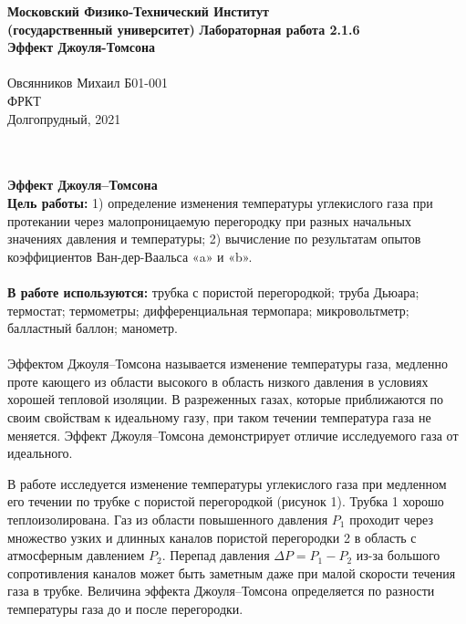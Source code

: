\documentclass[a4paper, 12pt]{article}
\begin{document}
	\begin{titlepage}
		\begin{center}
			\large\textbf{Московский Физико-Технический Институт}\\
			\large\textbf{(государственный университет)}
			\vfill
			\huge\textbf{Лабораторная работа 2.1.6\\ Эффект Джоуля-Томсона}\\
			\ \\
			\large Овсянников Михаил Б01-001\\
			\vfill
			\large ФРКТ\\
			\large Долгопрудный, 2021
		\end{center}
	\end{titlepage}
	\newpage
	\pagestyle{fancy}
	\setcounter{page}{2}
	\fancyfoot[c]{\thepage}
		\\ 
		\\
		\indent \textbf{\LARGE 		Эффект Джоуля–Томсона}
		\\
	
	\textbf{Цель работы:} 
	1) определение изменения температуры углекислого газа при протекании через малопроницаемую перегородку при разных начальных значениях давления и температуры; 2) вычисление по результатам опытов коэффициентов Ван-дер-Ваальса «a» и «b».
	\\ 
	\\
	\indent \textbf{В работе используются:} трубка с пористой перегородкой; труба Дьюара; термостат; термометры; дифференциальная термопара; микровольтметр; балластный баллон; манометр.
	\\
	\\
	\indent Эффектом Джоуля–Томсона называется изменение температуры газа, медленно проте кающего из области высокого в область низкого давления в условиях хорошей тепловой изоляции. В разреженных газах, которые приближаются по своим свойствам к идеальному газу, при таком течении температура газа не меняется. Эффект Джоуля–Томсона демонстрирует отличие исследуемого газа от идеального.
	
\indent В работе исследуется изменение температуры углекислого газа
при медленном его течении по трубке с пористой перегородкой (рисунок 1). Трубка 1 хорошо теплоизолирована. Газ из области повышенного давления $P_{1}$ проходит через множество узких и длинных каналов пористой перегородки 2 в область с атмосферным давлением $P_{2}$. Перепад давления $\Delta P = P_{1} - P_{2}$ из-за большого сопротивления каналов может быть заметным даже при малой скорости течения газа в трубке. Величина эффекта Джоуля–Томсона определяется по разности температуры газа до
и после перегородки.
\end{document}
